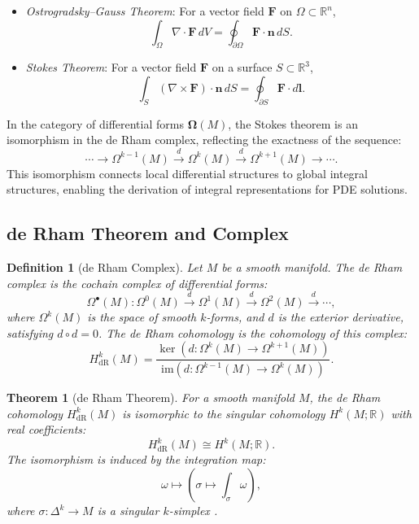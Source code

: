 \documentclass{article}
\theoremstyle{plain}
\newtheorem{theorem}{Theorem}[section]
\newtheorem{definition}{Definition}[section]
\newcommand{\cat}[1]{\mathbf{#1}}
\newcommand{\dR}{\mathrm{dR}}
\begin{document}
\begin{itemize}
    \item \emph{Ostrogradsky--Gauss Theorem}: For a vector field \(\mathbf{F}\) on \(\Omega \subset \mathbb{R}^n\),
    \[
    \int_\Omega \nabla \cdot \mathbf{F} \, dV = \oint_{\partial \Omega} \mathbf{F} \cdot \mathbf{n} \, dS.
    \]
    \item \emph{Stokes Theorem}: For a vector field \(\mathbf{F}\) on a surface \(S \subset \mathbb{R}^3\),
    \[
    \int_S (\nabla \times \mathbf{F}) \cdot \mathbf{n} \, dS = \oint_{\partial S} \mathbf{F} \cdot d\mathbf{l}.
    \]
\end{itemize}

In the category of differential forms \(\cat{\Omega}(M)\), the Stokes theorem is an isomorphism in the de Rham complex, reflecting the exactness of the sequence:
\[
\cdots \to \Omega^{k-1}(M) \xrightarrow{d} \Omega^k(M) \xrightarrow{d} \Omega^{k+1}(M) \to \cdots.
\]
This isomorphism connects local differential structures to global integral structures, enabling the derivation of integral representations for PDE solutions.

\subsection{de Rham Theorem and Complex}

\begin{definition}[de Rham Complex]
Let \(M\) be a smooth manifold. The \emph{de Rham complex} is the cochain complex of differential forms:
\[
\Omega^\bullet(M): \Omega^0(M) \xrightarrow{d} \Omega^1(M) \xrightarrow{d} \Omega^2(M) \xrightarrow{d} \cdots,
\]
where \(\Omega^k(M)\) is the space of smooth \(k\)-forms, and \(d\) is the exterior derivative, satisfying \(d \circ d = 0\). The \emph{de Rham cohomology} is the cohomology of this complex:
\[
H^k_{\dR}(M) = \frac{\ker(d: \Omega^k(M) \to \Omega^{k+1}(M))}{\mathrm{im}(d: \Omega^{k-1}(M) \to \Omega^k(M))}.
\]
\end{definition}

\begin{theorem}[de Rham Theorem]
For a smooth manifold \(M\), the de Rham cohomology \(H^k_{\dR}(M)\) is isomorphic to the singular cohomology \(H^k(M; \mathbb{R})\) with real coefficients:
\[
H^k_{\dR}(M) \cong H^k(M; \mathbb{R}).
\]
The isomorphism is induced by the integration map:
\[
\omega \mapsto \left( \sigma \mapsto \int_\sigma \omega \right),
\]
where \(\sigma: \Delta^k \to M\) is a singular \(k\)-simplex \cite{nLab_de_Rham_theorem}.
\end{theorem}
\end{document}
